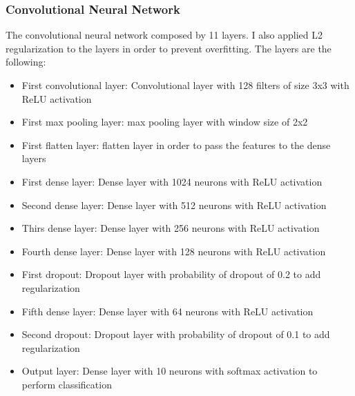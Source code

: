 \documentclass[12pt,journal,compsoc]{IEEEtran}
\begin{document}
\subsubsection{Convolutional Neural Network}
The convolutional neural network composed by 11 layers. I also applied L2 regularization to the layers in order to prevent overfitting. The layers are the following:
\begin{itemize}
	\item First convolutional layer: Convolutional layer with 128 filters of size 3x3 with ReLU activation
	\item First max pooling layer: max pooling layer with window size of 2x2
	\item First flatten layer: flatten layer in order to pass the features to the dense layers
	\item First dense layer: Dense layer with 1024 neurons with ReLU activation
	\item Second dense layer: Dense layer with 512 neurons with ReLU activation
	\item Thirs dense layer: Dense layer with 256 neurons with ReLU activation
	\item Fourth dense layer: Dense layer with 128 neurons with ReLU activation
	\item First dropout: Dropout layer with probability of dropout of 0.2 to add regularization
	\item Fifth dense layer: Dense layer with 64 neurons with ReLU activation
	\item Second dropout: Dropout layer with probability of dropout of 0.1 to add regularization
	\item Output layer: Dense layer with 10 neurons with softmax activation to perform classification
\end{itemize}
\end{document}
